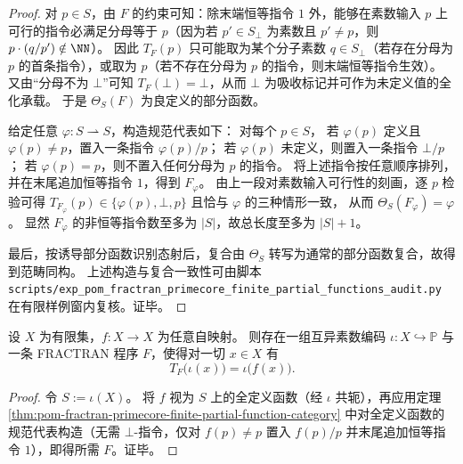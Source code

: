 \begin{proof}
对 \(p\in S\)，由 \(F\) 的约束可知：除末端恒等指令 \(1\) 外，能够在素数输入 \(p\) 上可行的指令必满足分母等于 \(p\)（因为若 \(p'\in S_\bot\) 为素数且 \(p'\neq p\)，则 \(p\cdot(q/p')\notin\NN\)）。
因此 \(T_F(p)\) 只可能取为某个分子素数 \(q\in S_\bot\)（若存在分母为 \(p\) 的首条指令），或取为 \(p\)（若不存在分母为 \(p\) 的指令，则末端恒等指令生效）。
又由“分母不为 \(\bot\)”可知 \(T_F(\bot)=\bot\)，从而 \(\bot\) 为吸收标记并可作为未定义值的全化承载。
于是 \(\Theta_S(F)\) 为良定义的部分函数。
\par
给定任意 \(\varphi:S\rightharpoonup S\)，构造规范代表如下：
对每个 \(p\in S\)，
若 \(\varphi(p)\) 定义且 \(\varphi(p)\neq p\)，置入一条指令 \(\varphi(p)/p\)；
若 \(\varphi(p)\) 未定义，则置入一条指令 \(\bot/p\)；
若 \(\varphi(p)=p\)，则不置入任何分母为 \(p\) 的指令。
将上述指令按任意顺序排列，并在末尾追加恒等指令 \(1\)，得到 \(F_\varphi\)。
由上一段对素数输入可行性的刻画，逐 \(p\) 检验可得 \(T_{F_\varphi}(p)\in\{\varphi(p),\bot,p\}\) 且恰与 \(\varphi\) 的三种情形一致，
从而 \(\Theta_S(F_\varphi)=\varphi\)。
显然 \(F_\varphi\) 的非恒等指令数至多为 \(|S|\)，故总长度至多为 \(|S|+1\)。
\par
最后，按诱导部分函数识别态射后，复合由 \(\Theta_S\) 转写为通常的部分函数复合，故得到范畴同构。
上述构造与复合一致性可由脚本 \texttt{scripts/exp\_pom\_fractran\_primecore\_finite\_partial\_functions\_audit.py} 在有限样例窗内复核。证毕。
\end{proof}

\begin{corollary}[有限更新表的素数寄存器一步编译]\label{cor:pom-fractran-finite-update-table-one-step}
设 \(X\) 为有限集，\(f:X\to X\) 为任意自映射。
则存在一组互异素数编码 \(\iota:X\hookrightarrow\mathbb P\) 与一条 FRACTRAN 程序 \(F\)，使得对一切 \(x\in X\) 有
\[
T_F\!\bigl(\iota(x)\bigr)=\iota\!\bigl(f(x)\bigr).
\]
\end{corollary}
\begin{proof}
令 \(S:=\iota(X)\)。
将 \(f\) 视为 \(S\) 上的全定义函数（经 \(\iota\) 共轭），再应用定理 \ref{thm:pom-fractran-primecore-finite-partial-function-category} 中对全定义函数的规范代表构造（无需 \(\bot\)-指令，仅对 \(f(p)\neq p\) 置入 \(f(p)/p\) 并末尾追加恒等指令 \(1\)），即得所需 \(F\)。证毕。
\end{proof}

